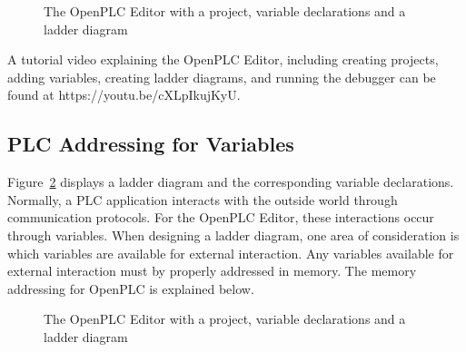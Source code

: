 \begin{figure}[!htb]
\begin{center}
\end{center}
\caption{The OpenPLC Editor with a project, variable declarations and a ladder diagram}
\label{fig:editorProject}
\end{figure}

A tutorial video explaining the OpenPLC Editor, including creating projects, adding variables, creating ladder diagrams, and running the debugger can be found at https://youtu.be/cXLpIkujKyU.


\subsection{PLC Addressing for Variables}
Figure~\ref{fig:addressing} displays a ladder diagram and the corresponding variable declarations. Normally, a PLC application interacts with the outside world through communication protocols. For the OpenPLC Editor, these interactions occur through variables.  When designing a ladder diagram, one area of consideration is which variables are available for external interaction. Any variables available for external interaction must by properly addressed in memory. The memory addressing for OpenPLC is explained below.

\begin{figure}[!htb]
\begin{center}
\end{center}
\caption{The OpenPLC Editor with a project, variable declarations and a ladder diagram}
\label{fig:addressing}
\end{figure}


